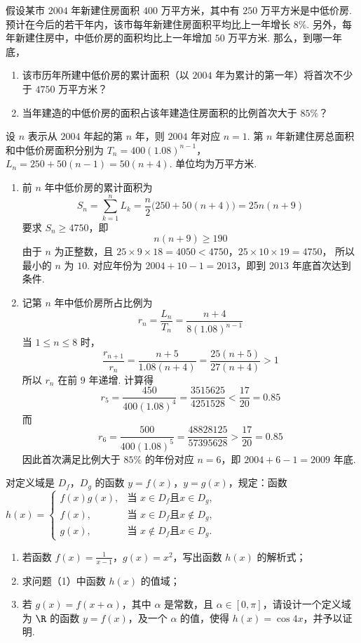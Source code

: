 \begin{problem}
假设某市 \(2004\) 年新建住房面积 \(400\) 万平方米，其中有 \(250\) 万平方米是中低价房. 预计在今后的若干年内，该市每年新建住房面积平均比上一年增长 \(8\%\). 另外，每年新建住房中，中低价房的面积均比上一年增加 \(50\) 万平方米. 那么，到哪一年底，

\begin{enumerate}
\item 该市历年所建中低价房的累计面积（以 \(2004\) 年为累计的第一年）将首次不少于 \(4750\) 万平方米？
\item 当年建造的中低价房的面积占该年建造住房面积的比例首次大于 \(85\%\)？
\end{enumerate}
\end{problem}

\begin{solution}
设 \(n\) 表示从 \(2004\) 年起的第 \(n\) 年，则 \(2004\) 年对应 \(n=1\). 第 \(n\) 年新建住房总面积和中低价房面积分别为 \(T_n=400(1.08)^{n-1}\)，\(L_n=250+50(n-1)=50(n+4)\).
单位均为万平方米.
\begin{enumerate}
\item 前 \(n\) 年中低价房的累计面积为
\[
S_n=\sum_{k=1}^{n}L_k=\frac{n}{2}\bigl(250+50(n+4)\bigr)=25n(n+9)
\]
要求 \(S_n\geqslant4750\)，即
\[
n(n+9)\geqslant190
\]
由于 \(n\) 为正整数，且 \(25\times9\times18=4050<4750\)，\(25\times10\times19=4750\)，
所以最小的 \(n\) 为 \(10\). 对应年份为 \(2004+10-1=2013\)，即到 \(2013\) 年底首次达到条件.

\item 记第 \(n\) 年中低价房所占比例为
\[
r_n=\frac{L_n}{T_n}=\frac{n+4}{8(1.08)^{n-1}}
\]
当 \(1\leqslant n\leqslant8\) 时，
\[
\frac{r_{n+1}}{r_n}=\frac{n+5}{1.08(n+4)}=\frac{25(n+5)}{27(n+4)}>1
\]
所以 \(r_n\) 在前 \(9\) 年递增. 计算得
\[
 r_5=\frac{450}{400(1.08)^4}=\frac{3515625}{4251528}<\frac{17}{20}=0.85
\]
而
\[
 r_6=\frac{500}{400(1.08)^5}=\frac{48828125}{57395628}>\frac{17}{20}=0.85
\]
因此首次满足比例大于 \(85\%\) 的年份对应 \(n=6\)，即 \(2004+6-1=2009\) 年底.
\end{enumerate}
\end{solution}

\begin{problem}
对定义域是 \(D_f\)，\(D_g\) 的函数 \(y = f(x)\)，\(y = g(x)\)，规定：函数
\(h(x) = \begin{cases}
f(x)g(x), & \text{当 } x \in D_f \text{且} x \in D_g,\\
f(x), & \text{当 } x \in D_f \text{且} x \notin D_g,\\
g(x), & \text{当 } x \notin D_f \text{且} x \in D_g.
\end{cases}\)

\begin{enumerate}
\item 若函数 \(f(x) = \frac{1}{x - 1}\)，\(g(x) = x^2\)，写出函数 \(h(x)\) 的解析式；
\item 求问题（1）中函数 \(h(x)\) 的值域；
\item 若 \(g(x) = f(x + \alpha)\)，其中 \(\alpha\) 是常数，且 \(\alpha \in [0, \pi]\)，请设计一个定义域为 \(\R\) 的函数 \(y = f(x)\)，及一个 \(\alpha\) 的值，使得 \(h(x) = \cos 4x\)，并予以证明.
\end{enumerate}
\end{problem}

